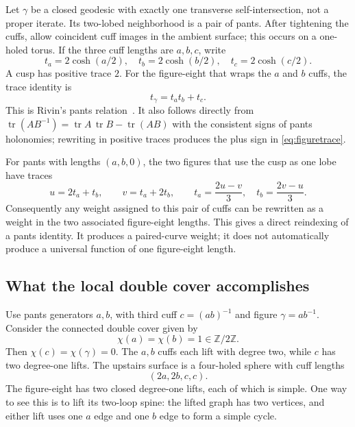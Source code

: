 \documentclass[11pt,a4paper]{article}
\numberwithin{equation}{section}
\theoremstyle{definition}
\theoremstyle{remark}
\DeclareMathOperator{\tr}{tr}
\newcommand{\ZZ}{\mathbb Z}
\begin{document}
Let $\gamma$ be a closed geodesic with exactly one transverse self-intersection,
not a proper iterate. Its two-lobed neighborhood is a pair of pants. After
tightening the cuffs, allow coincident cuff images in the ambient surface;
this occurs on a one-holed torus. If the three cuff lengths are $a,b,c$,
write
\[
 t_a=2\cosh(a/2),\quad t_b=2\cosh(b/2),\quad t_c=2\cosh(c/2).
\]
A cusp has positive trace $2$. For the figure-eight that wraps the $a$
and $b$ cuffs, the trace identity is
\begin{equation}
 \boxed{t_\gamma=t_at_b+t_c.}
 \label{eq:figuretrace}
\end{equation}
This is Rivin's pants relation~\cite[Theorem 1.3]{RivinFigures}. It also
follows directly from
$\tr(AB^{-1})=\tr A\,\tr B-\tr(AB)$ with the consistent signs of pants
holonomies; rewriting in positive traces produces the plus sign in
\eqref{eq:figuretrace}.

For pants with lengths $(a,b,0)$, the two figures that use the cusp as one
lobe have traces
\begin{equation}
 u=2t_a+t_b,\qquad v=t_a+2t_b,
 \qquad
 t_a=\frac{2u-v}{3},\quad t_b=\frac{2v-u}{3}.
 \label{eq:twofigures}
\end{equation}
Consequently any weight assigned to this pair of cuffs can be rewritten
as a weight in the two associated figure-eight lengths. This gives a
direct reindexing of a pants identity. It produces a paired-curve weight;
it does not automatically produce a universal function of one figure-eight
length.

\subsection{What the local double cover accomplishes}

Use pants generators $a,b$, with third cuff $c=(ab)^{-1}$ and figure
$\gamma=ab^{-1}$. Consider the connected double cover given by
\[
 \chi(a)=\chi(b)=1\in\ZZ/2\ZZ.
\]
Then $\chi(c)=\chi(\gamma)=0$. The $a,b$ cuffs each lift with degree two,
while $c$ has two degree-one lifts. The upstairs surface is a four-holed
sphere with cuff lengths
\begin{equation}
 (2a,2b,c,c).
 \label{eq:doublepants}
\end{equation}
The figure-eight has two closed degree-one lifts, each of which is simple.
One way to see this is to lift its two-loop spine: the lifted graph has
two vertices, and either lift uses one $a$ edge and one $b$ edge to form
a simple cycle.
\end{document}
